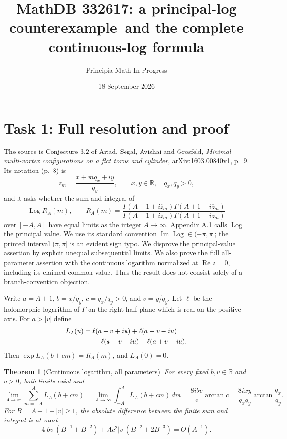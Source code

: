 \documentclass[10pt]{article}
\title{MathDB 332617: a principal-log counterexample\ and the complete continuous-log formula}
\author{Principia Math In Progress}
\date{18 September 2026}
\newtheorem{theorem}{Theorem}
\DeclareMathOperator{\Log}{Log}
\DeclareMathOperator{\Impart}{Im}
\DeclareMathOperator{\Repart}{Re}
\begin{document}
\maketitle

\section*{Task 1: Full resolution and proof}
The source is Conjecture 3.2 of Ariad, Segal, Avishai and Grosfeld,
\emph{Minimal multi-vortex configurations on a flat torus and cylinder},
\href{https://arxiv.org/abs/1603.00840v1}{arXiv:1603.00840v1}, p.~9.
Its notation (p.~8) is
\[
 z_m=\frac{x+m q_x+iy}{q_y},\qquad x,y\in\mathbb R,\quad q_x,q_y>0,
\]
and it asks whether the sum and integral of
\[
 \Log R_A(m),\qquad
 R_A(m)=\frac{\Gamma(A+1+i\overline z_m)\Gamma(A+1-i\overline z_m)}
 {\Gamma(A+1+iz_m)\Gamma(A+1-iz_m)}
\]
over $[-A,A]$ have equal limits as the integer $A\to\infty$.
Appendix A.1 calls $\Log$ the principal value. We use its standard
convention $\Impart\Log\in(-\pi,\pi]$; the printed interval
$(\pi,\pi]$ is an evident sign typo. We disprove the principal-value
assertion by explicit unequal subsequential limits. We also prove the
full all-parameter assertion with the continuous logarithm normalized
at $\Repart z=0$, including its claimed common value. Thus the result
does not consist solely of a branch-convention objection.

Write $a=A+1$, $b=x/q_y$, $c=q_x/q_y>0$, and $v=y/q_y$.
Let $\ell$ be the holomorphic logarithm of $\Gamma$ on the right
half-plane which is real on the positive axis. For $a>|v|$ define
\begin{align}
 L_A(u)={}&\ell(a+v+iu)+\ell(a-v-iu)\notag\\
          &-\ell(a-v+iu)-\ell(a+v-iu).                 \label{lift}
\end{align}
Then $\exp L_A(b+cm)=R_A(m)$, and $L_A(0)=0$.

\begin{theorem}[Continuous logarithm, all parameters]\label{general}
For every fixed $b,v\in\mathbb R$ and $c>0$, both limits exist and
\begin{equation}\label{limit}
 \lim_{A\to\infty}\sum_{m=-A}^{A}L_A(b+cm)
 =\lim_{A\to\infty}\int_{-A}^{A}L_A(b+cm)\,dm
 =\frac{8ibv}{c}\arctan c
 =\frac{8ixy}{q_xq_y}\arctan\frac{q_x}{q_y}.
\end{equation}
For $B=A+1-|v|\ge1$, the absolute difference between the finite sum
and integral is at most
\begin{equation}\label{bound}
 4|bv|(B^{-1}+B^{-2})
 +Ac^2|v|(B^{-2}+2B^{-3})=O(A^{-1}).
\end{equation}
\end{theorem}
\end{document}
